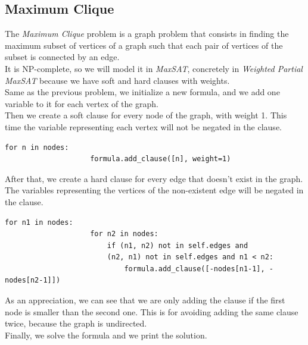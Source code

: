 \documentclass[11pt]{article}
\begin{document}
        \subsection{Maximum Clique}
        \label{subsec:maxclique}
            The \textit{Maximum Clique} problem is a graph problem that consists in finding the maximum subset of vertices of a graph such that each pair of vertices of the subset is connected by an edge.\\
            It is NP-complete, so we will model it in \textit{MaxSAT}, concretely in \textit{Weighted Partial MaxSAT} because we have soft and hard clauses with weights.\\
            Same as the previous problem, we initialize a new formula, and we add one variable to it for each vertex of the graph.\\
            Then we create a soft clause for every node of the graph, with weight 1.
            This time the variable representing each vertex will not be negated in the clause.
            \begin{lstlisting}[label={lst:lstlisting3}]
                for n in nodes:
                    formula.add_clause([n], weight=1)
            \end{lstlisting}
            After that, we create a hard clause for every edge that doesn't exist in the graph.
            The variables representing the vertices of the non-existent edge will be negated in the clause.
            \begin{lstlisting}[label={lst:lstlisting4}]
                for n1 in nodes:
                    for n2 in nodes:
                        if (n1, n2) not in self.edges and
                        (n2, n1) not in self.edges and n1 < n2:
                            formula.add_clause([-nodes[n1-1], -nodes[n2-1]])
            \end{lstlisting}
            As an appreciation, we can see that we are only adding the clause if the first node is smaller than the second one.
            This is for avoiding adding the same clause twice, because the graph is undirected.\\
            Finally, we solve the formula and we print the solution.\\
\end{document}
